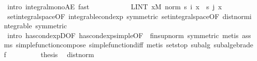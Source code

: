 \begin{isabellebody}
\ {\isacharparenleft}{\kern0pt}intro\ integral{\isacharunderscore}{\kern0pt}mono{\isacharunderscore}{\kern0pt}AE{\isacharcomma}{\kern0pt}\ fast{\isacharplus}{\kern0pt}{\isacharparenright}{\kern0pt}\isanewline
\ \ \ \ \ \ \isamarkupfalse%
\ \isamarkupfalse%
\ {\isachardoublequoteopen}{\isachardot}{\kern0pt}{\isachardot}{\kern0pt}{\isachardot}{\kern0pt}\ {\isacharequal}{\kern0pt}\ LINT\ x{\isacharbar}{\kern0pt}M{\isachardot}{\kern0pt}\ norm\ {\isacharparenleft}{\kern0pt}s\ i\ x\ {\isacharminus}{\kern0pt}\ s\ j\ x{\isacharparenright}{\kern0pt}{\isachardoublequoteclose}\ \isamarkupfalse%
\ set{\isacharunderscore}{\kern0pt}integral{\isacharunderscore}{\kern0pt}space{\isacharparenleft}{\kern0pt}{}{\isacharparenright}{\kern0pt}{\isacharbrackleft}{\kern0pt}OF\ integrable{\isacharunderscore}{\kern0pt}cond{\isacharunderscore}{\kern0pt}exp{\isacharcomma}{\kern0pt}\ symmetric{\isacharbrackright}{\kern0pt}\ set{\isacharunderscore}{\kern0pt}integral{\isacharunderscore}{\kern0pt}space{\isacharbrackleft}{\kern0pt}OF\ dist{\isacharunderscore}{\kern0pt}norm{\isacharunderscore}{\kern0pt}integrable{\isacharcomma}{\kern0pt}\ symmetric{\isacharbrackright}{\kern0pt}\ \isamarkupfalse%
\ {\isacharparenleft}{\kern0pt}intro\ has{\isacharunderscore}{\kern0pt}cond{\isacharunderscore}{\kern0pt}expD{\isacharparenleft}{\kern0pt}{}{\isacharparenright}{\kern0pt}{\isacharbrackleft}{\kern0pt}OF\ has{\isacharunderscore}{\kern0pt}cond{\isacharunderscore}{\kern0pt}exp{\isacharunderscore}{\kern0pt}simple{\isacharbrackleft}{\kern0pt}OF\ {\isacharunderscore}{\kern0pt}\ fin{\isacharunderscore}{\kern0pt}sup{\isacharunderscore}{\kern0pt}norm{\isacharbrackright}{\kern0pt}{\isacharcomma}{\kern0pt}\ symmetric{\isacharbrackright}{\kern0pt}{\isacharparenright}{\kern0pt}\ {\isacharparenleft}{\kern0pt}metis\ assms{\isacharparenleft}{\kern0pt}{}{\isacharparenright}{\kern0pt}\ simple{\isacharunderscore}{\kern0pt}function{\isacharunderscore}{\kern0pt}compose{}\ simple{\isacharunderscore}{\kern0pt}function{\isacharunderscore}{\kern0pt}diff{\isacharcomma}{\kern0pt}\ metis\ sets{\isachardot}{\kern0pt}top\ subalg\ subalgebra{\isacharunderscore}{\kern0pt}def{\isacharparenright}{\kern0pt}\isanewline
\ \ \ \ \ \ \isamarkupfalse%
\ \isamarkupfalse%
\ {\isacharquery}{\kern0pt}thesis\ \isamarkupfalse%
\ dist{\isacharunderscore}{\kern0pt}norm\ \isacommand{{\isachardot}{\kern0pt}}\isamarkupfalse%
\ \ \isanewline
\ \ \ \ \isamarkupfalse%

\end{isabellebody}

